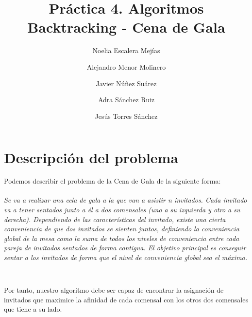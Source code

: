 \documentclass{article}
\title{Práctica 4. Algoritmos Backtracking - Cena de Gala}
\author{Noelia Escalera Mejías \\
	\and Alejandro Menor Molinero \\
	\and Javier Núñez Suárez \\
	\and Adra Sánchez Ruiz \\
	\and Jesús Torres Sánchez}
\begin{document}
	\maketitle
	\section{Descripción del problema}
	Podemos describir el problema de la Cena de Gala de la siguiente forma:
	\\ 
	\\
	\textit{Se va a realizar una cela de gala a la que van a asistir n invitados. Cada invitado va a tener sentados junto a él a dos comensales (uno a su izquierda y otro a su derecha). Dependiendo de las características del invitado, existe una cierta conveniencia de que dos invitados se sienten juntos, definiendo la conveniencia global de la mesa como la suma de todos los niveles de conveniencia entre cada pareja de invitados sentados de forma contigua. El objetivo principal es conseguir sentar a los invitados de forma que el nivel de conveniencia global sea el máximo.}
	
	\
	
	Por tanto, nuestro algoritmo debe ser capaz de encontrar la asignación de invitados que maximice la afinidad de cada comensal con los otros dos comensales que tiene a su lado.
	
\end{document}
